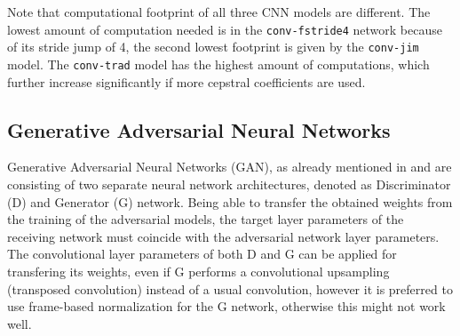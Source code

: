 \FloatBarrier
\noindent

Note that computational footprint of all three CNN models are different.
The lowest amount of computation needed is in the \texttt{conv-fstride4} network because of its stride jump of 4, the second lowest footprint is given by the \texttt{conv-jim} model.
The \texttt{conv-trad} model has the highest amount of computations, which further increase significantly if more cepstral coefficients are used.



\subsection{Generative Adversarial Neural Networks}\label{sec:nn_arch_adv}
Generative Adversarial Neural Networks (GAN), as already mentioned in  and  are consisting of two separate neural network architectures, denoted as Discriminator (D) and Generator (G) network.
Being able to transfer the obtained weights from the training of the adversarial models, the target layer parameters of the receiving network must coincide with the adversarial network layer parameters.
The convolutional layer parameters of both D and G can be applied for transfering its weights, even if G performs a convolutional upsampling (transposed convolution) instead of a usual convolution, however it is preferred to use frame-based normalization for the G network, otherwise this might not work well.

